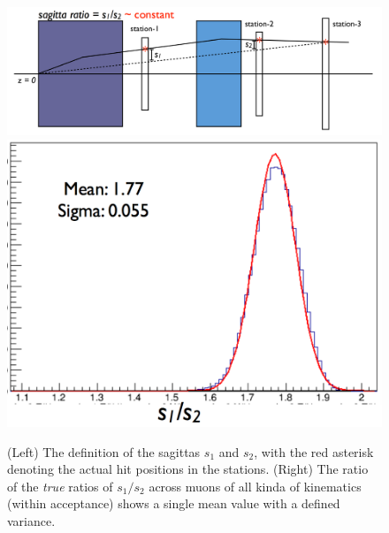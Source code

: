 \begin{figure}
	\centering
	\includegraphics[height=0.17\textheight]{figures/analysis/sagitta-def.png}
	\includegraphics[height=0.17\textheight]{figures/analysis/sagitta-ratio.png}
	\caption{(Left) The definition of the sagittas $s_1$ and $s_2$, with the red asterisk denoting the actual hit positions in the stations. (Right) The ratio of the \emph{true} ratios of $s_1/s_2$ across muons of all kinda of kinematics (within acceptance) shows a single mean value with a defined variance.}
	\label{fig:sagitta-ratio}
\end{figure}

